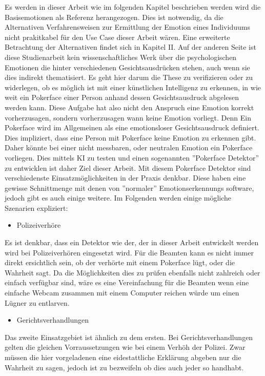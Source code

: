 \documentclass[12pt, a4paper]{scrbook}
\begin{document}
Es werden in dieser Arbeit wie im folgenden Kapitel beschrieben werden wird die Basisemotionen als Referenz herangezogen. Dies ist notwendig, da die Alternativen Verfahrensweisen zur Ermittlung
der Emotion eines Individuums nicht prakitkabel für den Use Case dieser Arbeit wären. Eine erweiterte Betrachtung der Alternativen findet sich in Kapitel II. Auf der anderen Seite ist diese
Studienarbeit kein wissenschaftliches Werk über die psychologischen Emotionen die hinter verschiedenen Gesichtsausdrücken stehen, auch wenn sie dies indirekt thematisiert. Es geht hier darum die
These zu verifizieren oder zu widerlegen, ob es möglich ist mit einer künstlichen Intelligenz zu erkennen, in wie weit ein Pokerface einer Person anhand dessen Gesichtsausdruck abgelesen werden
kann. Diese Aufgabe hat also nicht den Anspruch eine Emotion korrekt vorherzusagen, sondern vorherzusagen wann keine Emotion vorliegt. Denn Ein Pokerface wird im Allgemeinen als eine
emotionsloser Gesichtsausdruck definiert. Dies impliziert, dass eine Person mit Pokerface keine Emotion zu erkennen gibt. Daher könnte bei einer nicht messbaren, oder neutralen Emotion ein
Pokerface vorliegen. Dies mittels KI zu testen und einen sogenannten ''Pokerface Detektor'' zu entwicklen ist daher Ziel dieser Arbeit. Mit diesem Pokerface Detektor sind verschiedenste
Einsatzmöglichkeiten in der Praxis denkbar. Diese haben eine gewisse Schnittmenge mit denen von ''normaler'' Emotionserkennungs software, jedoch gibt es auch einige weitere. Im Folgenden werden
einige mögliche Szenarien expliziert:
\begin{itemize}
	\item{Polizeiverhöre}
\end{itemize}
Es ist denkbar, dass ein Detektor wie der, der in dieser Arbeit entwickelt werden wird bei Polizeiverhören eingesetzt wird. Für die Beamten kann es nicht immer direkt ersichtlich sein, ob der
verhörte mit einem Pokerface lügt, oder die Wahrheit sagt. Da die Möglichkeiten dies zu prüfen ebenfalls nicht zahlreich oder einfach verfügbar sind, wäre es eine Vereinfachung für die Beamten
wenn eine einfache Webcam zusammen mit einem Computer reichen würde um einen Lügner zu entlarven.
\begin{itemize}
	\item{Gerichtsverhandlungen}
\end{itemize}
Das zweite Einsatzgebiet ist ähnlich zu dem ersten. Bei Gerichtsverhandlungen gelten die gleichen Vorraussetzungen wie bei einem Verhöh der Polizei. Zwar müssen die hier vorgeladenen eine
eidestattliche Erklärung abgeben nur die Wahrheit zu sagen, jedoch ist zu bezweifeln ob dies auch jeder so handhabt.
\end{document}
